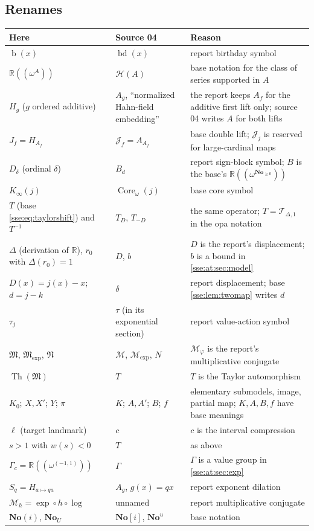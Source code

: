 \documentclass[11pt,a4paper]{article}
\numberwithin{equation}{section}
\theoremstyle{plain}
\theoremstyle{definition}
\theoremstyle{remark}
\newcommand{\No}{\mathbf{No}}
\newcommand{\R}{\mathbb{R}}
\newcommand{\bday}{\operatorname{b}}
\newcommand{\NF}[1]{\R((\omega^{#1}))}
\newcommand{\Mat}{\mathfrak{M}}
\newcommand{\Nat}{\mathfrak{N}}
\newcommand{\That}{\operatorname{Th}}
\begin{document}
\subsection{Renames}
\begin{longtable}{P{40mm}P{40mm}P{70mm}}
\toprule
Here & Source 04 & Reason \\
\midrule
\endhead
$\bday(x)$ & $\operatorname{bd}(x)$ & report birthday symbol \\
$\NF{A}$ & $\mathscr H(A)$ & base notation for the class of series supported in $A$ \\
$H_g$ ($g$ ordered additive) & $A_g$, ``normalized Hahn-field embedding'' & the report keeps $A_f$ for the additive first lift only; source 04 writes $A$ for both lifts \\
$J_f=H_{A_f}$ & $\mathcal J_f=A_{A_f}$ & base double lift; $\mathcal J_j$ is reserved for large-cardinal maps \\
$D_\delta$ (ordinal $\delta$) & $B_d$ & report sign-block symbol; $B$ is the base's $\NF{\No_{\ge0}}$ \\
$K_\infty(j)$ & $\operatorname{Core}_\omega(j)$ & base core symbol \\
$T$ (base \eqref{sse:eq:taylorshift}) and $T^{-1}$ & $T_D$, $T_{-D}$ & the same operator; $T=\mathcal T_{\Delta,1}$ in the opa notation \\
$\Delta$ (derivation of $\R$), $r_0$ with $\Delta(r_0)=1$ & $D$, $b$ & $D$ is the report's displacement; $b$ is a bound in \cref{sse:at:sec:model} \\
$D(x)=j(x)-x$; $d=j-k$ & $\delta$ & report displacement; base \cref{sse:lem:twomap} writes $d$ \\
$\tau_j$ & $\tau$ (in its exponential section) & report value-action symbol \\
$\Mat$, $\Mat_{\exp}$, $\Nat$ & $\mathcal M$, $\mathcal M_{\exp}$, $N$ & $\mathcal M_\varphi$ is the report's multiplicative conjugate \\
$\That(\Mat)$ & $T$ & $T$ is the Taylor automorphism \\
$K_0$; $X,X'$; $Y$; $\pi$ & $K$; $A,A'$; $B$; $f$ & elementary submodels, image, partial map; $K,A,B,f$ have base meanings \\
$\ell$ (target landmark) & $c$ & $c$ is the interval compression \\
$s>1$ with $w(s)<0$ & $T$ & as above \\
$\Gamma_c=\NF{(-1,1)}$ & $\Gamma$ & $\Gamma$ is a value group in \cref{sse:at:sec:exp} \\
$S_q=H_{a\mapsto qa}$ & $A_g$, $g(x)=qx$ & report exponent dilation \\
$\mathcal M_h=\exp\circ h\circ\log$ & unnamed & report multiplicative conjugate \\
$\No(i)$, $\No_U$ & $\No[i]$, $\No^u$ & base notation \\
\bottomrule
\end{longtable}
\end{document}
